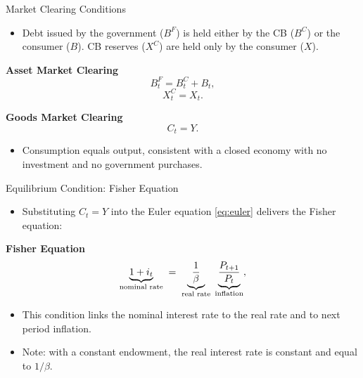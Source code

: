 \documentclass[11pt,aspectratio=169]{beamer}
\begin{document}
\begin{frame}[label=market]{Market Clearing Conditions}

\begin{itemize}
    \item Debt issued by the government ($B^F$) is held either by the CB ($B^C$) or the consumer ($B$). CB reserves ($X^C$) are held only by the consumer ($X$).
\end{itemize}

\vspace{0.25cm}
\noindent\textbf{Asset Market Clearing}
\begin{equation}
B_t^{F} = B_t^{C}+B_t,
\label{eq: Bonds}
\end{equation}
\begin{equation}
X_t^{C} = X_t.
\label{eq: reserves}
\end{equation}

\vspace{0.25cm}
\noindent\textbf{Goods Market Clearing}
\[
C_t=Y.
\]

\begin{itemize}
    \item Consumption equals output, consistent with a closed economy with no investment and no government purchases.
\end{itemize}

\vspace{0.3cm}
\begin{center}
\hyperlink{gdp_proof}{}
\end{center}

\end{frame}
\begin{frame}{Equilibrium Condition: Fisher Equation}
\begin{itemize}
  \item Substituting $C_t = Y$ into the Euler equation \eqref{eq:euler} delivers the Fisher equation:
\end{itemize}

\vspace{0.25cm}
\noindent\textbf{Fisher Equation}
\begin{equation}
\underbrace{1 + i_t}_{\text{\scriptsize nominal rate}}
\;=\;
\underbrace{\frac{1}{\beta}}_{\text{\scriptsize real rate}}
\;\underbrace{\frac{P_{t+1}}{P_t}}_{\text{\scriptsize inflation}},
\label{eq: Fisher}
\end{equation}


\begin{itemize}
  \item This condition links the nominal interest rate to the real rate and to next period inflation.
  \item Note: with a constant endowment, the real interest rate is constant and equal to $1/\beta$.
\end{itemize}
\end{frame}
\end{document}
